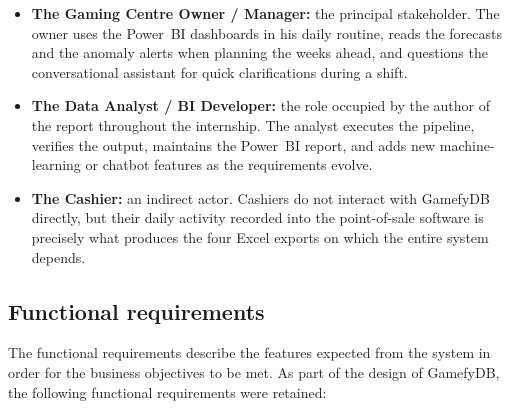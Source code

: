 \documentclass[12pt, a4paper]{report}
\begin{document}
\begin{itemize}
  \item \textbf{The Gaming Centre Owner / Manager:} the principal
        stakeholder. The owner uses the Power~BI dashboards in his daily
        routine, reads the forecasts and the anomaly alerts when planning
        the weeks ahead, and questions the conversational assistant for
        quick clarifications during a shift.
  \item \textbf{The Data Analyst / BI Developer:} the role occupied by the
        author of the report throughout the internship. The analyst
        executes the pipeline, verifies the output, maintains the
        Power~BI report, and adds new machine-learning or chatbot features
        as the requirements evolve.
  \item \textbf{The Cashier:} an indirect actor. Cashiers do not interact
        with GamefyDB directly, but their daily activity recorded into the
        point-of-sale software is precisely what produces the four Excel
        exports on which the entire system depends.
\end{itemize}

\subsection{Functional requirements}

The functional requirements describe the features expected from the system
in order for the business objectives to be met. As part of the design of
GamefyDB, the following functional requirements were retained:
\end{document}
